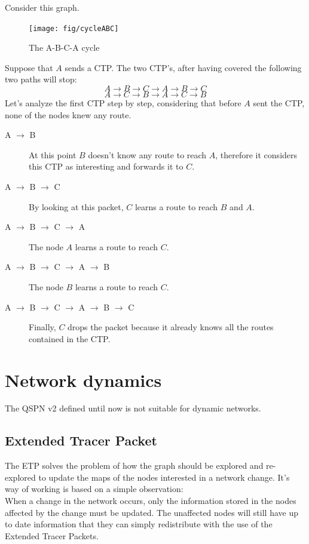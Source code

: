 \documentclass[a4paper]{article}
\begin{document}
Consider this graph. \\
\begin{figure}[h]
	\begin{center}
		\texttt{[image: fig/cycleABC]}
	\end{center}
	\caption{The A-B-C-A cycle}
	\label{fig:A-B-C-A}
\end{figure}
Suppose that $A$ sends a CTP. The two CTP's, after having covered the following
two paths will stop:
\[
A \rightarrow B \rightarrow C \rightarrow A \rightarrow B \rightarrow C
\]
\[
A \rightarrow C \rightarrow B\rightarrow A \rightarrow C \rightarrow B
\]
Let's analyze the first CTP step by step, considering that before $A$ sent the
CTP, none of the nodes knew any route.
\begin{description}
	\item[A $\rightarrow$ B] At this point $B$ doesn't know any route to
		reach $A$, therefore it considers this CTP as interesting and
		forwards it to $C$.
	\item[A $\rightarrow$ B $\rightarrow$ C] By looking at this packet, $C$
		learns a route to reach $B$ and $A$.
	\item[A $\rightarrow$ B $\rightarrow$ C $\rightarrow$ A] The node $A$
		learns a route to reach $C$.
	\item[A $\rightarrow$ B $\rightarrow$ C $\rightarrow$ A $\rightarrow$
		B] The node $B$ learns a route to reach $C$.
	\item[A $\rightarrow$ B $\rightarrow$ C $\rightarrow$ A $\rightarrow$
		B $\rightarrow$ C] Finally, $C$ drops the packet because it
		already knows all the routes contained in the CTP.
\end{description}

\section{Network dynamics}
\label{sec:netdyn}
The QSPN v2 defined until now is not suitable for dynamic networks.

\subsection{Extended Tracer Packet}
\label{sec:etp}
The ETP solves the problem of how the graph should be explored and re-explored to
update the maps of the nodes interested in a network change.
It's way of working is based on a simple observation:\\

When a change in the network occurs, only the information stored in the nodes affected by the change must be updated.
The unaffected nodes will still have up to date information that they can simply
redistribute with the use of the Extended Tracer Packets.\\
\end{document}
